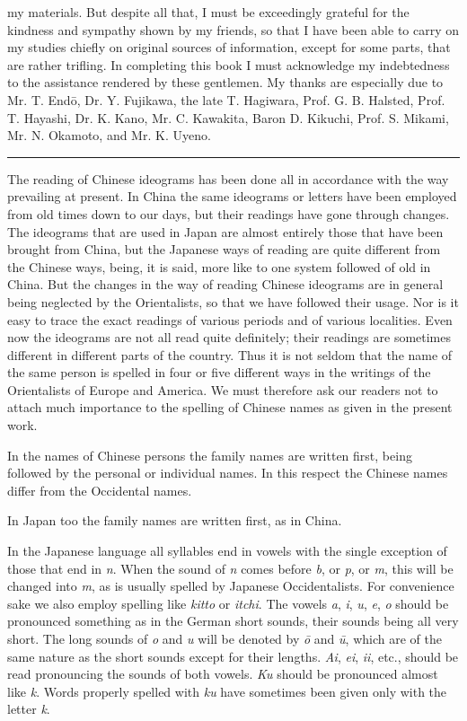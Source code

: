 \documentclass[11pt]{article}
\newcommand{\scanpage}[2]{\clearpage\setcounter{footnote}{0}\noindent{\footnotesize\color{gray}PDF page #1 · #2}\par\medskip}
\begin{document}
\scanpage{0011}{Introductory Note, second page}
my materials. But despite all that, I must be exceedingly grateful for the kindness and sympathy shown by my friends, so that I have been able to carry on my studies chiefly on original sources of information, except for some parts, that are rather trifling. In completing this book I must acknowledge my indebtedness to the assistance rendered by these gentlemen. My thanks are especially due to Mr. T. Endō, Dr. Y. Fujikawa, the late T. Hagiwara, Prof. G. B. Halsted, Prof. T. Hayashi, Dr. K. Kano, Mr. C. Kawakita, Baron D. Kikuchi, Prof. S. Mikami, Mr. N. Okamoto, and Mr. K. Uyeno.

\begin{center}\rule{3cm}{0.4pt}\end{center}

The reading of Chinese ideograms has been done all in accordance with the way prevailing at present. In China the same ideograms or letters have been employed from old times down to our days, but their readings have gone through changes. The ideograms that are used in Japan are almost entirely those that have been brought from China, but the Japanese ways of reading are quite different from the Chinese ways, being, it is said, more like to one system followed of old in China. But the changes in the way of reading Chinese ideograms are in general being neglected by the Orientalists, so that we have followed their usage. Nor is it easy to trace the exact readings of various periods and of various localities. Even now the ideograms are not all read quite definitely; their readings are sometimes different in different parts of the country. Thus it is not seldom that the name of the same person is spelled in four or five different ways in the writings of the Orientalists of Europe and America. We must therefore ask our readers not to attach much importance to the spelling of Chinese names as given in the present work.

In the names of Chinese persons the family names are written first, being followed by the personal or individual names. In this respect the Chinese names differ from the Occidental names.

In Japan too the family names are written first, as in China.

In the Japanese language all syllables end in vowels with the single exception of those that end in \emph{n}. When the sound of \emph{n} comes before \emph{b}, or \emph{p}, or \emph{m}, this will be changed into \emph{m}, as is usually spelled by Japanese Occidentalists. For convenience sake we also employ spelling like \emph{kitto} or \emph{itchi}. The vowels \emph{a}, \emph{i}, \emph{u}, \emph{e}, \emph{o} should be pronounced something as in the German short sounds, their sounds being all very short. The long sounds of \emph{o} and \emph{u} will be denoted by \emph{ō} and \emph{ū}, which are of the same nature as the short sounds except for their lengths. \emph{Ai}, \emph{ei}, \emph{ii}, etc., should be read pronouncing the sounds of both vowels. \emph{Ku} should be pronounced almost like \emph{k}. Words properly spelled with \emph{ku} have sometimes been given only with the letter \emph{k}.
\end{document}
